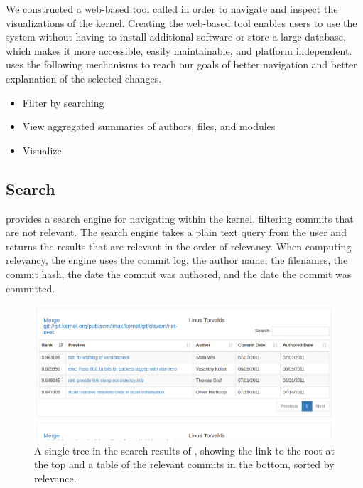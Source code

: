 
We constructed a web-based tool called \tool in order to navigate and
inspect the \mt visualizations of the kernel. Creating the web-based
tool enables users to use the system without having to install
additional software or store a large database, which makes it more
accessible, easily maintainable, and platform independent. \tool uses
the following mechanisms to reach our goals of better navigation and
better explanation of the selected changes.

\begin{itemize}
        \item Filter by searching
        \item View aggregated summaries of authors, files, and modules
        \item Visualize 
\end{itemize}

\subsection{Search}

\tool provides a search engine for navigating within the kernel,
filtering commits that are not relevant. The search engine takes a
plain text query from the user and returns the results that are relevant
in the order of relevancy. When computing relevancy, the engine uses the
commit log, the author name, the filenames, the commit hash, the date
the commit was authored, and the date the commit was committed.

\begin{figure}[htpb]
  \centering
  \includegraphics[width=\linewidth]{figures/linvis/search_results.png}
  \caption{A single \mt tree in the search results of \tool, showing
    the link to the root at the top and a table of the relevant commits
    in the bottom, sorted by relevance.}
  \label{fig:search_results}
\end{figure}

